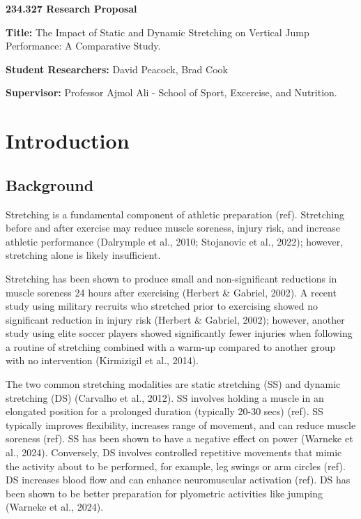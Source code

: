 \documentclass[stu, floatsintext, a4paper]{apa7}
\author{David Peacock}
\date{\today}
\title{}
\begin{document}
\linenumbers
{}

\textbf{234.327 Research Proposal}

\textbf{Title:} The Impact of Static and Dynamic Stretching on Vertical Jump Performance: A Comparative Study.

\textbf{Student Researchers:} David Peacock, Brad Cook

\textbf{Supervisor:} Professor Ajmol Ali - School of Sport, Excercise, and Nutrition.

\section{Introduction}
\label{sec:org7fb18b4}

\subsection{Background}
\label{sec:org0615964}

Stretching is a fundamental component of athletic preparation (ref). Stretching before and after exercise may reduce muscle soreness, injury risk, and increase athletic performance (Dalrymple et al., 2010; Stojanovic et al., 2022); however, stretching alone is likely insufficient.

Stretching has been shown to produce small and non-significant reductions in muscle soreness 24 hours after exercising (Herbert \& Gabriel, 2002). A recent study using military recruits who stretched prior to exercising showed no significant reduction in injury risk (Herbert \& Gabriel, 2002); however, another study using elite soccer players showed significantly fewer injuries when following a routine of stretching combined with a warm-up compared to another group with no intervention (Kirmizigil et al., 2014).

The two common stretching modalities are static stretching (SS) and dynamic stretching (DS) (Carvalho et al., 2012). SS involves holding a muscle in an elongated position for a prolonged duration (typically 20-30 secs) (ref). SS typically improves flexibility, increases range of movement, and can reduce muscle soreness (ref). SS has been shown to have a negative effect on power (Warneke et al., 2024). Conversely, DS involves controlled repetitive movements that mimic the activity about to be performed, for example, leg swings or arm circles (ref). DS increases blood flow and can enhance neuromuscular activation (ref). DS has been shown to be better preparation for plyometric activities like jumping (Warneke et al., 2024).
\end{document}
